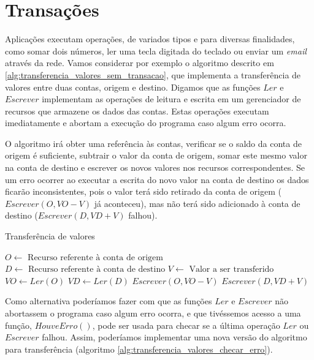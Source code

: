 \documentclass[11pt,twoside,a4paper]{book}
\begin{document}
\section{Transações}
\label{sec:transacoes}
Aplicações executam operações, de variados tipos e para diversas finalidades, como somar dois números, ler uma tecla digitada do teclado ou enviar um \emph{email} através da rede. Vamos considerar por exemplo o algoritmo descrito em \ref{alg:transferencia_valores_sem_transacao}, que implementa a transferência de valores entre duas contas, origem e destino. Digamos que as funções $Ler$ e $Escrever$ implementam as operações de leitura e escrita em um gerenciador de recursos que armazene os dados das contas. Estas operações executam imediatamente e abortam a execução do programa caso algum erro ocorra.

O algoritmo irá obter uma referência às contas, verificar se o saldo da conta de origem é suficiente, subtrair o valor da conta de origem, somar este mesmo valor na conta de destino e escrever os novos valores nos recursos correspondentes. Se um erro ocorrer ao executar a escrita do novo valor na conta de destino os dados ficarão inconsistentes, pois o valor terá sido retirado da conta de origem ($Escrever(O, VO - V)$ já aconteceu), mas não terá sido adicionado à conta de destino ($Escrever(D, VD + V)$ falhou).

\begin{algorithm}
\caption{Transferência de valores}
\label{alg:transferencia_valores_sem_transacao}
\begin{algorithmic}[1]
\State $O \gets \text{ Recurso referente à conta de origem}$
\State $D \gets \text{ Recurso referente à conta de destino}$
\State $V \gets \text{ Valor a ser transferido}$
\State $VO \gets Ler(O)$
    \State $VD \gets Ler(D)$
    \State $Escrever(O, VO - V)$
    \State $Escrever(D, VD + V)$
\EndIf
\end{algorithmic}
\end{algorithm}

Como alternativa poderíamos fazer com que as funções $Ler$ e $Escrever$ não abortassem o programa caso algum erro ocorra, e que tivéssemos acesso a uma função, $HouveErro()$, pode ser usada para checar se a última operação $Ler$ ou $Escrever$ falhou. Assim, poderíamos implementar uma nova versão do algoritmo para transferência (algoritmo \ref{alg:transferencia_valores_checar_erro}).
\end{document}
